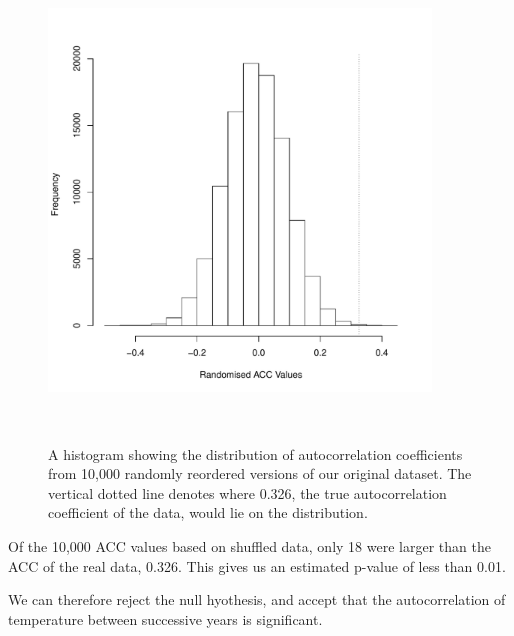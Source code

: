 \documentclass[12pt]{article}
\begin{document}
\begin{figure}[hbp!]
\centering
\includegraphics[width = 4in, height = 5in]{../../week3/data/ACC_Hist.pdf}
\caption{A histogram showing the distribution of autocorrelation 
coefficients from 10,000 randomly reordered versions of our original dataset. 
The vertical dotted line denotes where 0.326, the true autocorrelation
coefficient of the data, would lie on the distribution.} 
\label{fig:Figure 2}
\end{figure}

\vspace{10mm} 

Of the 10,000 ACC values based on shuffled data, only 18 were larger than 
the ACC of the real data, 0.326. This gives us an estimated p-value of less than 
0.01.

We can therefore reject the null hyothesis, and accept that the autocorrelation 
of temperature between successive years is significant. 
\end{document}
